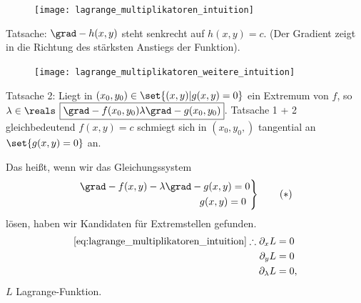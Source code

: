 \begin{ergaenzung*}
  \begin{figure}[H]
    \centering
    \texttt{[image: lagrange\_multiplikatoren\_intuition]}
    \label{fig:lagrange_multiplikatoren_intuition}
  \end{figure}
  Tatsache: \( \grad-{h}(x,y) \) steht senkrecht auf \( h(x,y)=c \). (Der Gradient zeigt in die Richtung des stärksten Anstiegs der Funktion).
  \begin{figure}[H]
    \centering
    \texttt{[image: lagrange\_multiplikatoren\_weitere\_intuition]}
    \label{fig:lagrange_multiplikatoren_weitere_intuition}
  \end{figure}
  Tatsache 2: Liegt in \( (x_0,y_0)\in \set{(x,y)|g(x,y)=0} \) ein Extremum von \( f \), so \texists \( \lambda\in \reals \) \sd \(\boxed{ \grad-{f}(x_0,y_0)\lambda\grad-{g}(x_0,y_0) }\). Tatsache 1 + 2 gleichbedeutend \( f(x,y)=c \) schmiegt sich in \( (x_0,y_0,) \) tangential an \( \set{g(x,y)=0} \) an.

  Das heißt, wenn wir das Gleichungssystem
  \begin{equation*}
    \left.\begin{aligned}
      \grad-{f}(x,y)-\lambda\grad-{g}(x,y&)=0\\
      g(x,y)&=0
    \end{aligned}\right\}\tag{\( * \)}\label{eq:lagrange_multiplikatoren_intuition}
  \end{equation*}
  lösen, haben wir Kandidaten für Extremstellen gefunden.
  \begin{align*}
    \eqref{eq:lagrange_multiplikatoren_intuition}\therefore \begin{aligned}[t]
      \partial_x L&=0\\
      \partial_y L&=0\\
      \partial_{\lambda} L&=0,
    \end{aligned}
  \end{align*}
  \( L \) Lagrange-Funktion.
\end{ergaenzung*}
